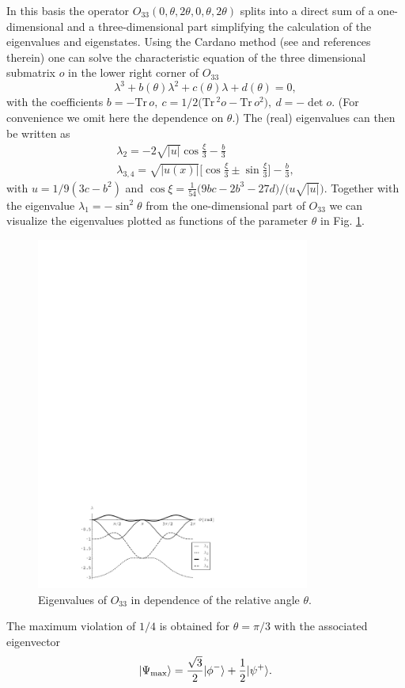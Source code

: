 \documentclass[prl,showpacs,showkeys,amsfonts,amsmath,twocolumn]{revtex4}
\newcommand{\ket}[1]{|#1\rangle}
\newcommand{\Tr}{\text{Tr}\,}
\begin{document}
In this basis the operator $O_{33}(0,\theta,2\theta,0,\theta,2\theta)$ splits into a direct sum of a one-dimensional
and a three-dimensional part simplifying the calculation of the
eigenvalues and eigenstates. Using the Cardano method
(see \cite{cocolicchio00} and references therein) one can
solve the characteristic equation of the three dimensional submatrix
$o$ in the lower right corner of $O_{33}$
\begin{equation}
  \lambda^3 + b(\theta) \lambda^2 + c(\theta) \lambda + d(\theta) = 0,
\label{2004-qbounds-characteristic}
\end{equation}
with the coefficients $b = -\Tr o,\ c = 1/2\Big(\Tr^2 o -
\Tr o^2 \Big),\ d = -\det o$. (For convenience we omit here the
dependence on $\theta$.) The (real) eigenvalues can then be written as \cite{cocolicchio00}
\begin{eqnarray}
\lambda_2 = -2 \sqrt{|u|}\cos\frac{\xi}{3}-\frac{b}{3}\nonumber\\
\lambda_{3,4} = \sqrt{|u(x)|}\Big[\cos\frac{\xi}{3} \pm
\sin\frac{\xi}{3}\Big]-\frac{b}{3},
\label{2004-qbounds-o33ev}
\end{eqnarray}
with $u=1/9(3 c-b^2)$ and $\cos\xi = \frac{1}{54}\big(9 b c -2 b^3 - 27 d\big)/\big(u\sqrt{|u|}\big)$.
Together with the eigenvalue $\lambda_1 = -\sin^2\theta$ from the
one-dimensional part of $O_{33}$ we can visualize the eigenvalues plotted as functions of
the parameter $\theta$ in Fig. \ref{fig:2004-qbounds-f1}.
\begin{figure}[htbp]
  \centering
  \includegraphics[width=90mm]{2004-qbounds-f1}
  \caption{Eigenvalues of $O_{33}$ in dependence of the relative angle $\theta$.}
  \label{fig:2004-qbounds-f1}
\end{figure}
The maximum violation of $1/4$ is obtained for $\theta=\pi/3$ with the associated
eigenvector
\begin{equation}
  \ket{\Psi_{\rm max}}=\frac{\sqrt{3}}{2}\ket{\phi^-}+\frac{1}{2}\ket{\psi^+}.
\label{2004-qbounds-pmax33}
\end{equation}
\end{document}
